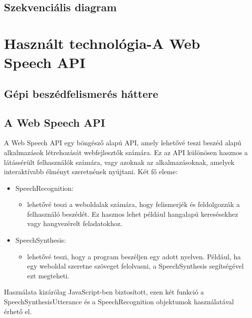 \documentclass[12pt]{report}
\begin{document}
\section{Szekvenciális diagram}
\chapter{Használt technológia-A Web Speech API}
\section{Gépi beszédfelismerés háttere}
\section{A Web Speech API}
A Web Speech API \cite{webspeechapi} egy böngésző alapú API, amely lehetővé teszi beszéd alapú alkalmazások létrehozását webfejlesztők számára. Ez az API különösen hasznos a látássérült felhasználók számára, vagy azoknak az alkalmazásoknak, amelyek interaktívabb élményt szeretnének nyújtani. Két fő eleme:
\begin{itemize}
    \item SpeechRecognition:
    \begin{itemize}
	   \item lehetővé teszi a weboldalak számára, hogy felismerjék és feldolgozzák a felhasználó beszédét. Ez hasznos lehet például hangalapú keresésekhez vagy hangvezérelt feladatokhoz.
    \end{itemize}
    \item SpeechSynthesis:
    \begin{itemize}
	   \item lehetővé teszi, hogy a program beszéljen egy adott nyelven. Például, ha egy weboldal szeretne szöveget felolvasni, a SpeechSynthesis segítségével ezt megteheti.
    \end{itemize}
\end{itemize}
\newline
Használata kizárólag JavaScript-ben biztosított, ezen két funkció a SpeechSynthesisUtterance és a SpeechRecognition objektumok használatával érhető el.\cite{usingwebspeechapi}
\pagebreak
\end{document}
